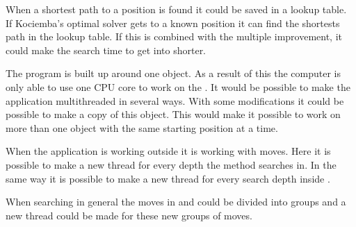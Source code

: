 	
When a shortest path to a position is found it could be saved in a lookup table.
If Kociemba's optimal solver gets to a known position it can find the shortests path in the lookup table.
If this is combined with the multiple  improvement, it could make the search time to get into  shorter.
 
The program is built up around one \cube{} object.
As a result of this the computer is only able to use one CPU core to work on the \cube{}.
It would be possible to make the application multithreaded in several ways.
With some modifications it could be possible to make a copy of this \cube{} object.
This would make it possible to work on more than one \cube{} object with the same starting position at a time.

When the application is working outside  it is working with  moves.
Here it is possible to make a new thread for every depth the method searches in.
In the same way it is possible to make a new thread for every search depth inside .

When searching in general the moves in  and  could be divided into groups and a new thread could be made for these new groups of moves.
